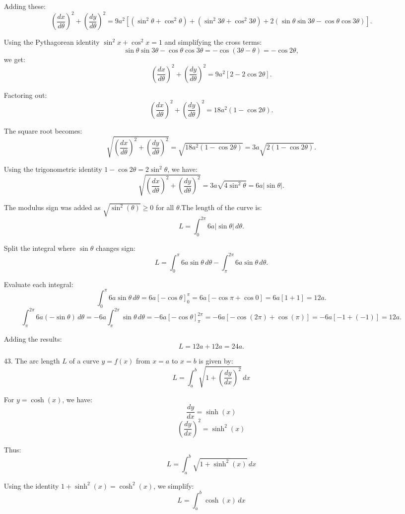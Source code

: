 \documentclass[12pt]{article}
\begin{document}
\begin{enumerate}
Adding these:
\[
\left(\frac{dx}{d\theta}\right)^2 + \left(\frac{dy}{d\theta}\right)^2 = 9a^2 \left[(\sin^2\theta + \cos^2\theta) + (\sin^2 3\theta + \cos^2 3\theta) + 2 (\sin\theta \sin 3\theta - \cos\theta \cos 3\theta)\right].
\]

Using the Pythagorean identity \(\sin^2 x + \cos^2 x = 1\) and simplifying the cross terms:
\[
\sin\theta \sin 3\theta - \cos\theta \cos 3\theta = -\cos(3\theta - \theta) = -\cos 2\theta,
\]
we get:
\[
\left(\frac{dx}{d\theta}\right)^2 + \left(\frac{dy}{d\theta}\right)^2 = 9a^2 \left[2 - 2\cos 2\theta\right].
\]

Factoring out:
\[
\left(\frac{dx}{d\theta}\right)^2 + \left(\frac{dy}{d\theta}\right)^2 = 18a^2 (1 - \cos 2\theta).
\]

The square root becomes:
\[
\sqrt{\left(\frac{dx}{d\theta}\right)^2 + \left(\frac{dy}{d\theta}\right)^2} = \sqrt{18a^2 (1 - \cos 2\theta)} = 3a \sqrt{2(1 - \cos 2\theta)}.
\]

Using the trigonometric identity \(1 - \cos 2\theta = 2 \sin^2\theta\), we have:
\[
\sqrt{\left(\frac{dx}{d\theta}\right)^2 + \left(\frac{dy}{d\theta}\right)^2} = 3a \sqrt{4 \sin^2\theta} = 6a |\sin\theta|.
\]

 The modulus sign was added as $\sqrt{\sin^2(\theta)} \geq 0$ for all $\theta$.The length of the curve is:
\[
L = \int_0^{2\pi} 6a |\sin\theta| \, d\theta.
\]

Split the integral where \(\sin\theta\) changes sign:
\[
L = \int_0^\pi 6a \sin\theta \, d\theta - \int_\pi^{2\pi} 6a \sin\theta \, d\theta.
\]

Evaluate each integral:
\[
\int_0^\pi 6a \sin\theta \, d\theta = 6a [-\cos\theta]_0^\pi = 6a [-\cos\pi + \cos 0] = 6a [1 + 1] = 12a.
\]
\[
\int_\pi^{2\pi} 6a (-\sin\theta) \, d\theta = -6a \int_\pi^{2\pi} \sin\theta \, d\theta = -6a [-\cos\theta]_\pi^{2\pi} = -6a [-\cos(2\pi) + \cos(\pi)] = -6a [-1 + (-1)] = 12a.
\]

Adding the results:
\[
L = 12a + 12a = 24a.
\]

\item [43. ]
The arc length \(L\) of a curve \(y = f(x)\) from \(x = a\) to \(x = b\) is given by:
\[
L = \int_a^b \sqrt{1 + \left( \frac{dy}{dx} \right)^2} \, dx
\]

For \(y = \cosh(x)\), we have:
\[
\frac{dy}{dx} = \sinh(x)
\]
\[
\left( \frac{dy}{dx} \right)^2 = \sinh^2(x)
\]

Thus:
\[
L = \int_a^b \sqrt{1 + \sinh^2(x)} \, dx
\]

Using the identity \(1 + \sinh^2(x) = \cosh^2(x)\), we simplify:
\[
L = \int_a^b \cosh(x) \, dx
\]


\end{enumerate}
\end{document}
